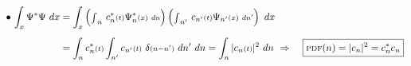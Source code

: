 \documentclass[12pt]{article}
\begin{document}
\vspace{5pt}\noindent \( \hspace{2pt} \bullet \ \begin{aligned}[t]
    \int_x \Psi^* \Psi \ dx 
        &= \int_x 
        \left( {\scriptstyle\int}_{n} \ c_n^*{\scriptstyle(t)} \Psi_n^*{\scriptstyle(x)} \ {\scriptstyle dn} \right)
        \left( {\scriptstyle\int}_{n'} \ c_{n'}{\scriptstyle(t)} \Psi_{n'}{\scriptstyle(x)} \ {\scriptstyle dn'} \right)
        \ dx \\[5pt]
    &= \int_{n} c_n^*{\scriptstyle(t)} \int_{n'} 
        c_{n'}{\scriptstyle(t)} \ \delta{\scriptstyle(n-n')} \ dn' \ dn 
        = \int_n | c_n{\scriptstyle(t)} |^2 \ dn
        \ \Rightarrow \ \Aboxed{ \text{\scriptsize PDF}(n) = | c_n |^2 = c_n^* c_n }
\end{aligned} \)
\end{document}
